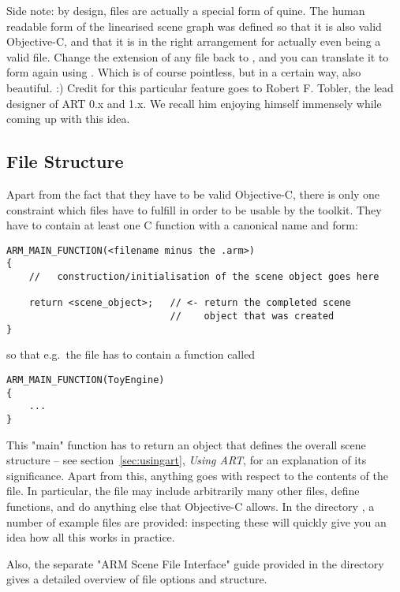 Side note: by design,  files are actually a special form of quine. The human readable form of the linearised scene graph was defined so that it is also valid Objective-C, and that it is in the right arrangement for actually even being a valid  file. Change the extension of any  file back to , and you can translate it to  form again using . Which is of course pointless, but in a certain way, also beautiful. :) Credit for this particular feature goes to Robert F. Tobler, the lead designer of ART 0.x and 1.x. We recall him enjoying himself immensely while coming up with this idea.

\subsection{ File Structure}
Apart from the fact that they have to be valid Objective-C, there is only one
constraint which  files have to fulfill in order to be usable by
the toolkit. They have to contain at least one C function with a canonical name and form:
\begin{verbatim}
ARM_MAIN_FUNCTION(<filename minus the .arm>)
{
    //   construction/initialisation of the scene object goes here
    
    return <scene_object>;   // <- return the completed scene 
                             //    object that was created
}
\end{verbatim}
so that e.g.\ the file  has to contain a function called
\begin{verbatim}
ARM_MAIN_FUNCTION(ToyEngine)
{
    ...
}
\end{verbatim}
This "main" function has to return an  object that defines the
overall scene structure -- see section~\ref{sec:usingart}, \emph{Using ART}, for an explanation of
its significance. Apart from this, anything goes with respect to the contents of the file. In particular, the file may include arbitrarily many other files, define functions, and do anything else that Objective-C allows. In the directory , a number of example files are provided: inspecting these will quickly give you an idea how all this works in practice.

Also, the separate "ARM Scene File Interface" guide provided in the  directory gives a detailed overview of  file options and structure.

